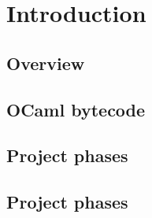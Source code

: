 \chapter{Introduction}

\section{Overview}

\section{OCaml bytecode}

\section{Project phases}

\section{Project phases}
